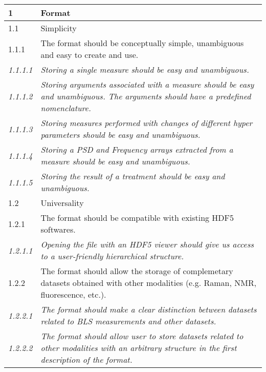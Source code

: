 \renewcommand{\arraystretch}{1.4} %

\begin{tabular}{|p{1cm}|p{14cm}|}
    \hline
    \rowcolor{grayheavy} 1 & Format \\ \hline

    \rowcolor{graylight} 1.1 & Simplicity \\ \hline

    \rowcolor{graysuperlight} 1.1.1 &  The format should be conceptually simple, unambiguous and easy to create and use. \\ \hline
    \textit{1.1.1.1} & \textit{Storing a single measure should be easy and unambiguous.} \\ \hline
    \textit{1.1.1.2} & \textit{Storing arguments associated with a measure should be easy and unambiguous. The arguments should have a predefined nomenclature.} \\ \hline
    \textit{1.1.1.3} & \textit{Storing measures performed with changes of different hyper parameters should be easy and unambiguous.} \\ \hline
    \textit{1.1.1.4} & \textit{Storing a PSD and Frequency arrays extracted from a measure should be easy and unambiguous.} \\ \hline
    \textit{1.1.1.5} & \textit{Storing the result of a treatment should be easy and unambiguous.} \\ \hline

    \rowcolor{graylight} 1.2 & Universality \\ \hline

    \rowcolor{graysuperlight} 1.2.1 &  The format should be compatible with existing HDF5 softwares. \\ \hline
    \textit{1.2.1.1} & \textit{Opening the file with an HDF5 viewer should give us access to a user-friendly hierarchical structure.} \\ \hline

    \rowcolor{graysuperlight} 1.2.2 &  The format should allow the storage of complemetary datasets obtained with other modalities (e.g. Raman, NMR, fluorescence, etc.). \\ \hline
    \textit{1.2.2.1} & \textit{The format should make a clear distinction between datasets related to BLS measurements and other datasets.} \\ \hline
    \textit{1.2.2.2} & \textit{The format should allow user to store datasets related to other modalities with an arbitrary structure in the first description of the format.} \\ \hline


\end{tabular}
